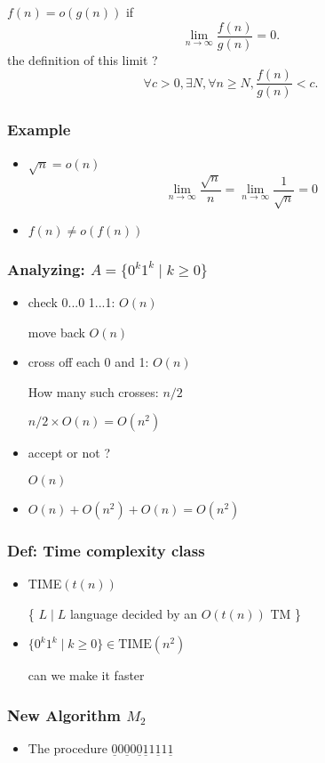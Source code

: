 \begin{frame}[allowframebreaks]
\begin{itemize}
$f(n)=o(g(n))$ if
  \begin{equation*}
    \lim_{n\rightarrow \infty} \frac{f(n)}{g(n)} = 0.
  \end{equation*}
the definition of this limit ?
\begin{equation*}
  \forall c > 0, \exists N, \forall n \geq N,
\frac{f(n)}{g(n)} < c.
\end{equation*}
\end{itemize}\end{frame} \begin{frame}[allowframebreaks] \frametitle{Example}
  \begin{itemize}
\item $\sqrt{n}= o(n)$
  \begin{equation*}
    \lim_{n \rightarrow \infty} \frac{\sqrt{n}}{n}
=
   \lim_{n \rightarrow \infty} \frac{1}{\sqrt{n}}=0
  \end{equation*}
\item $f(n) 
\neq o(f(n))$
\end{itemize}\end{frame} \begin{frame}[allowframebreaks] \frametitle{Analyzing: $A=\{0^k 1^k\mid k \geq 0\}$}
    \begin{itemize}
\item check 0...0 1...1: $O(n)$

move back $O(n)$
\item cross off each 0 and 1: $O(n)$

How many such crosses: $n/2$

$n/2 \times O(n) = O(n^2)$
\item accept or not ?

$O(n)$
\item $O(n) + O(n^2) +O(n) = O(n^2)$
\end{itemize}\end{frame} \begin{frame}[allowframebreaks] \frametitle{Def: Time complexity class}
  \begin{itemize}
\item TIME$(t(n))$

\{ $L\mid L$ language decided by an $O(t(n))$
TM
\}
\item $\{0^k 1^k \mid k \geq 0\} \in \textrm{TIME}(n^2)$

can we make it faster

\end{itemize}\end{frame} \begin{frame}[allowframebreaks] \frametitle{New Algorithm $M_2$}
  \begin{itemize}
\item The procedure
$\underline{0}0
\underline{0}0
\underline{0}
\underline{1}1
\underline{1}1
\underline{1}
$


\end{itemize}
\end{frame}

